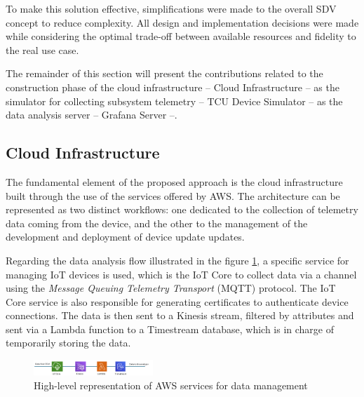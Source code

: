 \documentclass[10pt,a4paper,roman, twocolumn]{article}
\begin{document}
To make this solution effective, simplifications were made to the overall SDV concept to reduce complexity. All design and implementation decisions were made while considering the optimal trade-off between available resources and fidelity to the real use case.

The remainder of this section will present the contributions related to the construction phase of the cloud infrastructure -- Cloud Infrastructure -- as the simulator for collecting subsystem telemetry -- TCU Device Simulator -- as the data analysis server -- Grafana Server --. 

\subsection{Cloud Infrastructure}
The fundamental element of the proposed approach is the cloud infrastructure built through the use of the services offered by AWS. The architecture can be represented as two distinct workflows: one dedicated to the collection of telemetry data coming from the device, and the other to the management of the development and deployment of device update updates.

Regarding the data analysis flow illustrated in the figure \ref{fig:AWSDataServices}, a specific service for managing IoT devices is used, which is the IoT Core to collect data via a channel using the \textit{Message Queuing Telemetry Transport} (MQTT) protocol. The IoT Core service is also responsible for generating certificates to authenticate device connections. The data is then sent to a Kinesis stream, filtered by attributes and sent via a Lambda function to a Timestream database, which is in charge of temporarily storing the data.
\begin{figure} [tbh]
	\centerline{\includegraphics[width=0.4\textwidth]{images/AWS_data_services.png}}
	\caption{High-level representation of AWS services for data management}
	\label{fig:AWSDataServices}
\end{figure}
\end{document}

